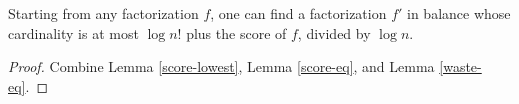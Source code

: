 \begin{proposition}
\label{card-bound}
\leanok
Starting from any factorization $f$, one can find a factorization $f'$ in balance whose
  cardinality is at most $\log n!$ plus the score of $f$, divided by $\log n$.
\end{proposition}
\begin{proof}
\leanok
Combine Lemma \ref{score-lowest}, Lemma \ref{score-eq}, and
  Lemma \ref{waste-eq}.
\end{proof}
